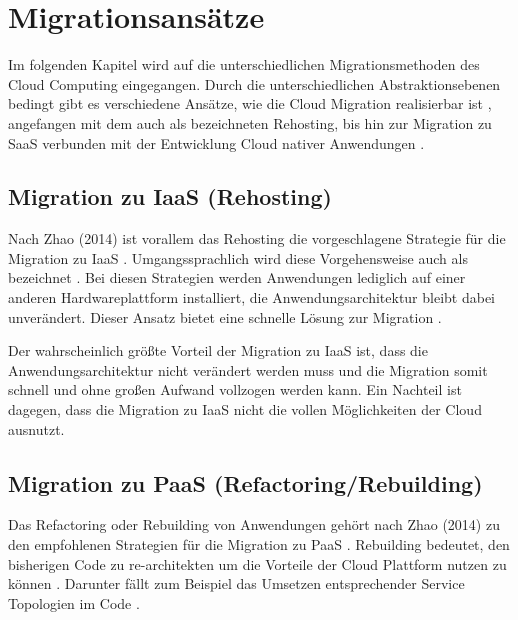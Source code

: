 \section{Migrationsansätze}
\label{sec:migrationsansaetze}


Im folgenden Kapitel wird auf die unterschiedlichen Migrationsmethoden des Cloud Computing eingegangen. Durch die unterschiedlichen Abstraktionsebenen bedingt gibt es verschiedene Ansätze, wie die Cloud Migration realisierbar ist \cite[Vgl.][S. 226]{Surianarayanan2019}, angefangen mit dem auch als \grqq{} bezeichneten Rehosting, bis hin zur Migration zu \ac{SaaS} verbunden mit der Entwicklung Cloud nativer Anwendungen \cite[Vgl.][S. 144]{Zhao2014}.

\subsection{Migration zu IaaS (Rehosting)}
Nach Zhao (2014) ist vorallem das Rehosting die vorgeschlagene Strategie für die Migration zu \ac{IaaS} \cite[Vgl.][S. 144]{Zhao2014}. Umgangssprachlich wird diese Vorgehensweise auch als \grqq{} bezeichnet \cite[Vgl.][]{NetApp}. Bei diesen Strategien werden Anwendungen lediglich auf einer anderen Hardwareplattform installiert, die Anwendungsarchitektur bleibt dabei unverändert. Dieser Ansatz bietet eine schnelle Lösung zur Migration \cite[Vgl.][]{CIO}.

Der wahrscheinlich größte Vorteil der Migration zu \ac{IaaS} ist, dass die Anwendungsarchitektur nicht verändert werden muss und die Migration somit schnell und ohne großen Aufwand vollzogen werden kann. Ein Nachteil ist dagegen, dass die Migration zu \ac{IaaS} nicht die vollen Möglichkeiten der Cloud ausnutzt.

\subsection{Migration zu PaaS (Refactoring/Rebuilding)}
Das Refactoring oder Rebuilding von Anwendungen gehört nach Zhao (2014) zu den empfohlenen Strategien für die Migration zu \ac{PaaS} \cite[Vgl.][S. 144]{Zhao2014}. Rebuilding bedeutet, den bisherigen Code zu re-architekten um die Vorteile der Cloud Plattform nutzen zu können \cite[Vgl.][]{CIO}. Darunter fällt zum Beispiel das Umsetzen entsprechender Service Topologien im Code \cite[Vgl.][S. 2]{Holmes2018}.

